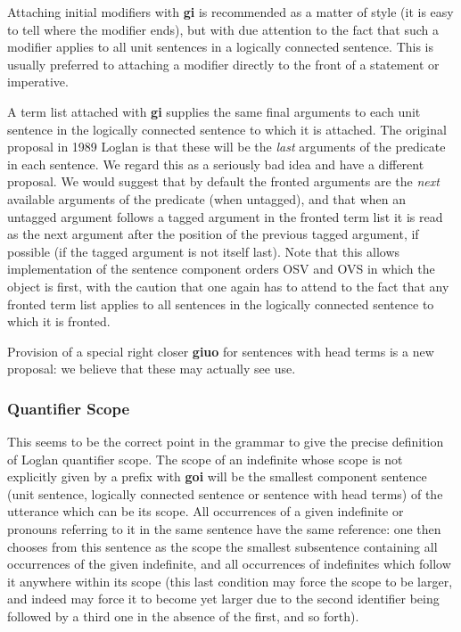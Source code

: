 \documentclass[12pt]{book}
\begin{document}
{Attaching initial modifiers with {\bf gi} is recommended as a matter of style (it is easy to tell where the modifier ends), but with due attention to the fact that such a modifier applies to all unit sentences in a logically connected sentence.  This is usually preferred to attaching a modifier directly to the front of a statement or imperative.

A term list attached with {\bf gi} supplies the same final arguments to each unit sentence in the logically connected sentence to which it is attached.  The original proposal in 1989 Loglan is that these will be the {\em last\/} arguments of the predicate in each sentence.  We regard this as a seriously bad idea and have a different proposal.  We would suggest that by default the fronted arguments are the {\em next\/} available arguments of the predicate (when untagged), and that when an untagged argument follows a tagged argument in the fronted term list it is read as the next argument after the position of the previous tagged argument, if possible (if the tagged argument is not itself last).  Note that this allows implementation of the sentence component orders OSV and OVS in which the object is first, with the caution that one again has to attend to the fact that any fronted term list applies to all sentences in the logically connected sentence to which it is fronted.

Provision of a special right closer {\bf giuo} for sentences with head terms is a new proposal:  we believe that these may actually see use.

\subsubsection{Quantifier Scope}

This seems to be the correct point in the grammar to give the precise definition of Loglan quantifier scope.  The scope of an indefinite whose scope is not explicitly given by a prefix with {\bf goi} will be the smallest component sentence (unit sentence, logically connected sentence or sentence with head terms) of the utterance which can be its scope.  All occurrences of a given indefinite or pronouns referring to it in the same sentence have the same reference:  one then chooses from this sentence as the scope the smallest subsentence containing all occurrences of the given indefinite, and all occurrences of indefinites which follow it anywhere within its scope (this last condition may force the scope to be larger, and indeed may force it to become yet larger due to the second identifier being followed by a third one in the absence of the first, and so forth). 

}
\end{document}
